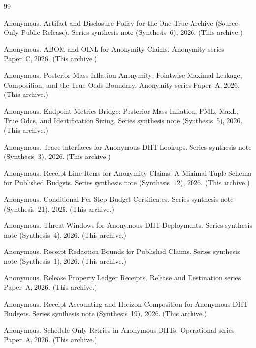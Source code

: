 \documentclass[11pt]{article}
\begin{document}
\begin{thebibliography}{99}\small

Anonymous.
\newblock Artifact and Disclosure Policy for the One-True-Archive (Source-Only Public Release).
\newblock Series synthesis note (Synthesis~6), 2026. (This archive.)

Anonymous.
\newblock ABOM and OINL for Anonymity Claims.
\newblock Anonymity series Paper~C, 2026. (This archive.)

Anonymous.
\newblock Posterior-Mass Inflation Anonymity: Pointwise Maximal Leakage, Composition, and the True-Odds Boundary.
\newblock Anonymity series Paper~A, 2026. (This archive.)

Anonymous.
\newblock Endpoint Metrics Bridge: Posterior-Mass Inflation, PML, MaxL, True Odds, and Identification Sizing.
\newblock Series synthesis note (Synthesis~5), 2026. (This archive.)

Anonymous.
\newblock Trace Interfaces for Anonymous DHT Lookups.
\newblock Series synthesis note (Synthesis~3), 2026. (This archive.)

Anonymous.
\newblock Receipt Line Items for Anonymity Claims: A Minimal Tuple Schema for Published Budgets.
\newblock Series synthesis note (Synthesis~12), 2026. (This archive.)

Anonymous.
\newblock Conditional Per-Step Budget Certificates.
\newblock Series synthesis note (Synthesis~21), 2026. (This archive.)


Anonymous.
\newblock Threat Windows for Anonymous DHT Deployments.
\newblock Series synthesis note (Synthesis~4), 2026. (This archive.)

Anonymous.
\newblock Receipt Redaction Bounds for Published Claims.
\newblock Series synthesis note (Synthesis~1), 2026. (This archive.)

Anonymous.
\newblock Release Property Ledger Receipts.
\newblock Release and Destination series Paper~A, 2026. (This archive.)

Anonymous.
\newblock Receipt Accounting and Horizon Composition for Anonymous-DHT Budgets.
\newblock Series synthesis note (Synthesis~19), 2026. (This archive.)

Anonymous.
\newblock Schedule-Only Retries in Anonymous DHTs.
\newblock Operational series Paper~A, 2026. (This archive.)


\end{thebibliography}
\end{document}
